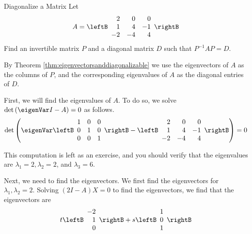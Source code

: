 \begin{example}{Diagonalize a Matrix}\label{exa:diagonalizematrix}
Let 
\begin{equation*}
A=\leftB
\begin{array}{rrr}
2 & 0 & 0 \\
1 & 4 & -1 \\
-2 & -4 & 4
\end{array}
\rightB 
\end{equation*}
 Find an invertible matrix $P$ and a diagonal matrix $D$ such that $P^{-1}AP=D$.
\end{example}

\begin{solution}
By Theorem \ref{thm:eigenvectorsanddiagonalizable} we use the eigenvectors of $A$ as the columns of $P$, and
the corresponding eigenvalues of $A$ as the diagonal entries of $D$. 

First, we will find the eigenvalues of $A$. To do so, we solve $\det \left( \eigenVar I -A \right) =0$ as follows.
\begin{equation*}
\det
\left(
\eigenVar
\leftB
\begin{array}{rrr}
1 & 0 & 0 \\
0 & 1 & 0 \\
0 & 0 & 1
\end{array}
\rightB
-
\leftB
\begin{array}{rrr}
2 & 0 & 0 \\
1 & 4 & -1 \\
-2 & -4 & 4
\end{array}
\rightB
\right)
=
0
\end{equation*}

This computation is left as an exercise, and you should verify that the eigenvalues are $\lambda_1 =2,
\lambda_2 = 2$, and $\lambda_3 = 6$.

Next, we need to find the eigenvectors. We first find the eigenvectors for $\lambda_1, \lambda_2 = 2$. 
Solving $\left(2I - A \right)X = 0$ to find the eigenvectors, we find that the
eigenvectors are
\begin{equation*}
t\leftB
\begin{array}{r}
-2 \\
1 \\
0
\end{array}
\rightB +s\leftB
\begin{array}{r}
1 \\
0 \\
1
\end{array}
\rightB
\end{equation*}


\end{solution}
